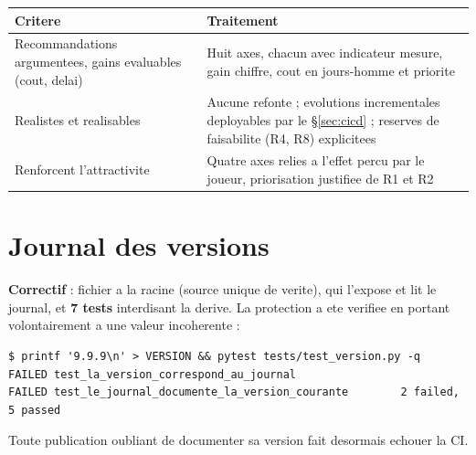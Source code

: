 \couverture
\footnotesize
\begin{tabularx}{\linewidth}{@{}L{4.4cm} X@{}}
\toprule
\textbf{Critere} & \textbf{Traitement} \\
\midrule
Recommandations argumentees, gains evaluables (cout, delai) & Huit axes, chacun avec indicateur mesure, gain chiffre, cout en jours-homme et priorite \\
Realistes et realisables & Aucune refonte ; evolutions incrementales deployables par le \S\ref{sec:cicd} ; reserves de faisabilite (R4, R8) explicitees \\
Renforcent l'attractivite & Quatre axes relies a l'effet percu par le joueur, priorisation justifiee de R1 et R2 \\
\bottomrule
\end{tabularx}
\normalsize

\section{Journal des versions}
\label{sec:journal}



\textbf{Correctif} : fichier  a la racine (source unique de verite),
 qui l'expose et lit le journal, et \textbf{7 tests} interdisant la
derive. La protection a ete verifiee en portant volontairement  a une valeur
incoherente :

\begin{lstlisting}[style=sortie]
$ printf '9.9.9\n' > VERSION && pytest tests/test_version.py -q
FAILED test_la_version_correspond_au_journal
FAILED test_le_journal_documente_la_version_courante        2 failed, 5 passed
\end{lstlisting}

Toute publication oubliant de documenter sa version fait desormais echouer la CI.

